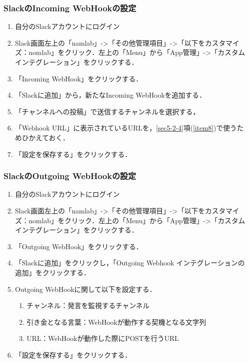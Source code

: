 \documentclass[12pt]{jsarticle}
\begin{document}
\subsubsection{SlackのIncoming WebHookの設定}\label{sec:IW}
\begin{enumerate}
\item 自分のSlackアカウントにログイン
\item Slack画面左上の「namlab」-\textgreater「その他管理項目」-\textgreater「以下をカスタマイズ：nomlab」をクリック．左上の「Menu」から「App管理」-\textgreater「カスタムインテグレーション」をクリックする．
\item 「Incoming WebHook」をクリックする．
\item 「Slackに追加」から，新たなIncoming WebHookを追加する．
\item 「チャンネルへの投稿」で送信するチャンネルを選択する，
\item 「Webhook URL」に表示されているURLを，\ref{sec5-2-4}項(\ref{item8})で使うためひかえておく．\label{url}
\item 「設定を保存する」をクリックする．
\end{enumerate}

\subsubsection{SlackのOutgoing WebHookの設定}
\begin{enumerate}
\item 自分のSlackアカウントにログイン
\item Slack画面左上の「namlab」-\textgreater「その他管理項目」-\textgreater「以下をカスタマイズ：nomlab」をクリック．左上の「Menu」から「App管理」-\textgreater「カスタムインテグレーション」をクリックする．
\item 「Outgoing WebHook」をクリックする．
\item 「Slackに追加」をクリックし，「Outgoing Webhook インテグレーションの追加」をクリックする．
\item Outgoing WebHookに関して以下を設定する．
  \begin{enumerate}
  \item チャンネル：発言を監視するチャンネル
  \item 引き金となる言葉：WebHookが動作する契機となる文字列
  \item URL：WebHookが動作した際にPOSTを行うURL
  \end{enumerate}
\item 「設定を保存する」をクリックする．
\end{enumerate}
\end{document}
